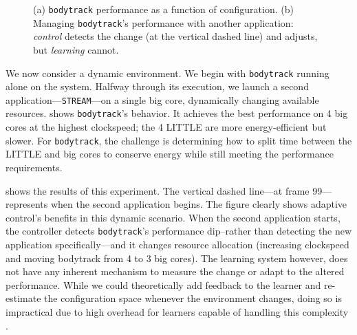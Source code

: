 \begin{figure}
\centering
  \subfloat[]
  {
    
    \label{fig:BODYTRACK_timeline}    
  }
  \caption{(a) \texttt{bodytrack} performance as a function of
    configuration. (b) Managing \texttt{bodytrack}'s performance with
    another application: \emph{control} detects the change (at the
    vertical dashed line) and adjusts, but \emph{learning} cannot. }
  \label{fig:control}
\end{figure}


We now consider a dynamic environment.  We begin with
\texttt{bodytrack} running alone on the system.  Halfway through its
execution, we launch a second application---\texttt{STREAM}---on a
single big core, dynamically changing available resources.
 shows \texttt{bodytrack}'s behavior.
It achieves the best performance on 4 big cores at the highest
clockspeed; the 4 LITTLE are more energy-efficient but slower.  For
\texttt{bodytrack}, the challenge is determining how to split time
between the LITTLE and big cores to conserve energy while still
meeting the performance requirements.

 shows the results of this experiment.
The vertical dashed line---at frame 99---represents when the second
application begins.  The figure clearly shows adaptive control's
benefits in this dynamic scenario.  When the second application
starts, the controller detects \texttt{bodytrack}'s performance
dip--rather than detecting the new application specifically---and it
changes resource allocation (increasing clockspeed and moving
bodytrack from 4 to 3 big cores).  The learning system however, does
not have any inherent mechanism to measure the change or adapt to the
altered performance.  While we could theoretically add feedback to the
learner and re-estimate the configuration space whenever the
environment changes, doing so is impractical due to high overhead for
learners capable of handling this complexity
\cite{Paragon,quasar,LEO}.


